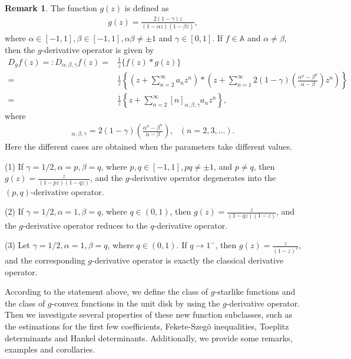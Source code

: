 \documentclass[11pt,twoside, reqno]{article}
\theoremstyle{definition}
\newtheorem{remark}[theorem]{Remark}
\begin{document}
\begin{remark}
The function $g(z)$ is defined as
\begin{align}
g(z)=\frac{2(1-\gamma)z}{(1-\alpha z)(1-\beta z)},\nonumber
\end{align}
where $\alpha\in[-1,1], \beta\in[-1,1], \alpha\beta\neq\pm1$ and $\gamma\in[0,1]$. If $f\in \mathbb{A}$  and $\alpha \neq \beta$, then the $g$-derivative operator is given by
\begin{align}\nonumber
D_{g}f(z)=: D_{\alpha,\beta,\gamma}f(z)=&\frac{1}{z}\{f(z)\ast g(z)\}\\\nonumber
=&\frac{1}{z}\left\{\left(z+\sum_{n=2}^{\infty}a_{n}z^{n}\right) \ast \left(z+ \sum_{n=1}^{\infty}2(1-\gamma)\left(\frac{\alpha^{n}-\beta^{n}}{\alpha-\beta}\right)z^{n}\right)\right\}\\\nonumber
=&\frac{1}{z}\left\{z+ \sum_{n=2}^{\infty}[n]_{\alpha,\beta,\gamma}a_{n}z^{n}\right\},\nonumber
\end{align}
where
\begin{align}
[n]_{\alpha,\beta,\gamma}=2(1-\gamma)\left(\frac{\alpha^{n}-\beta^{n}}{\alpha-\beta}\right),\ \ \ (n=2,3,...)\nonumber.
\end{align}
Here the different cases are obtained when the parameters take different values.

(1) If $\gamma=1/2, \alpha=p, \beta=q$, where $p,q\in[-1,1], pq\neq\pm1$, and $p \neq q$, then $g(z)=\frac{z}{(1-pz)(1-qz)}$, and the $g$-derivative operator degenerates into the $(p, q)$-derivative operator.

(2) If $\gamma=1/2, \alpha=1, \beta=q$, where $q\in(0,1)$, then $g(z)=\frac{z}{(1-qz)(1-z)}$, and the $g$-derivative operator reduces to the $q$-derivative operator.

(3) Let $\gamma=1/2, \alpha=1, \beta=q$, where $q\in(0,1)$. If $q\rightarrow1^{-}$, then $g(z)=\frac{z}{(1-z)^{2}}$, and the corresponding $g$-derivative operator is exactly the classical derivative operator.
\end{remark}

According to the statement above, we define the class of $g$-starlike functions and the class of $g$-convex functions in the unit disk by using the $g$-derivative operator. Then we investigate several properties of these new function subclasses, such as the estimations for the first few coefficients, Fekete-Szeg\"{o} inequalities, Toeplitz determinants and Hankel determinants. Additionally, we provide some remarks, examples and corollaries.
\end{document}
